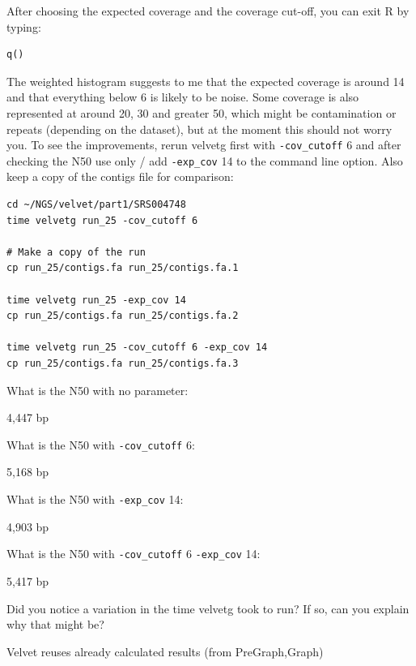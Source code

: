 \begin{steps}
After choosing the expected coverage and the coverage cut-off, you can exit R by
typing:
\begin{lstlisting}
q()
\end{lstlisting}
\end{steps}

\begin{steps}
The weighted histogram suggests to me that the expected coverage is around 14
and that everything below 6 is likely to be noise. Some coverage is also
represented at around 20, 30 and greater 50, which might be contamination or
repeats (depending on the dataset), but at the moment this should not worry you.
To see the improvements, rerun velvetg first with \texttt{-cov\_cutoff} 6 and
after checking the N50 use only / add \texttt{-exp\_cov} 14 to the command line
option. Also keep a copy of the contigs file for comparison:
\begin{lstlisting}
cd ~/NGS/velvet/part1/SRS004748
time velvetg run_25 -cov_cutoff 6

# Make a copy of the run
cp run_25/contigs.fa run_25/contigs.fa.1

time velvetg run_25 -exp_cov 14
cp run_25/contigs.fa run_25/contigs.fa.2

time velvetg run_25 -cov_cutoff 6 -exp_cov 14
cp run_25/contigs.fa run_25/contigs.fa.3
\end{lstlisting}
\end{steps}

\begin{questions}
What is the N50 with no parameter:
\begin{answer}
4,447 bp
\end{answer}

What is the N50 with \texttt{-cov\_cutoff} 6:
\begin{answer}
5,168 bp
\end{answer}

What is the N50 with \texttt{-exp\_cov} 14:
\begin{answer}
4,903 bp
\end{answer}

What is the N50 with \texttt{-cov\_cutoff} 6 \texttt{-exp\_cov} 14:
\begin{answer}
5,417 bp
\end{answer}

Did you notice a variation in the time velvetg took to run? If so, can you
explain why that might be?
\begin{answer}
Velvet reuses already calculated results (from PreGraph,Graph)
\end{answer}

\end{questions}

